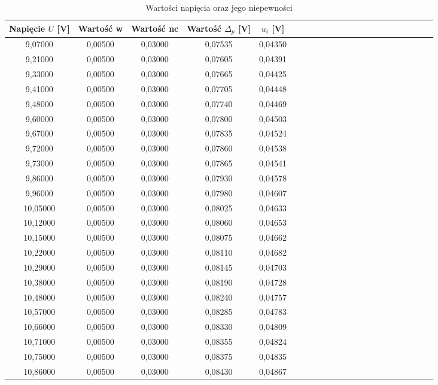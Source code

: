 \documentclass[10pt,a4paper]{article}
\begin{document}
\begin{center}
 \begin{table}[h!]
 \centering
 \caption{Wartości napięcia oraz jego niepewności}
 \begin{tabular}{|c|c|c|c|c|c|c|c|c|c|c|c|c|c|c|c|c|c|c|c|c|c|}
 \hline
Napięcie $U$ [V]&Wartość w& Wartość nc&Wartość $\Delta_{p}$ [V]& $u_{i}$ [V]\\ 
\hline
9,07000  & 0,00500 & 0,03000 & 0,07535 & 0,04350 \\ \hline
9,21000  & 0,00500 & 0,03000 & 0,07605 & 0,04391 \\ \hline
9,33000  & 0,00500 & 0,03000 & 0,07665 & 0,04425 \\ \hline
9,41000  & 0,00500 & 0,03000 & 0,07705 & 0,04448 \\ \hline
9,48000  & 0,00500 & 0,03000 & 0,07740 & 0,04469 \\ \hline
9,60000  & 0,00500 & 0,03000 & 0,07800 & 0,04503 \\ \hline
9,67000  & 0,00500 & 0,03000 & 0,07835 & 0,04524 \\ \hline
9,72000  & 0,00500 & 0,03000 & 0,07860 & 0,04538 \\ \hline
9,73000  & 0,00500 & 0,03000 & 0,07865 & 0,04541 \\ \hline
9,86000  & 0,00500 & 0,03000 & 0,07930 & 0,04578 \\ \hline
9,96000  & 0,00500 & 0,03000 & 0,07980 & 0,04607 \\ \hline
10,05000 & 0,00500 & 0,03000 & 0,08025 & 0,04633 \\ \hline
10,12000 & 0,00500 & 0,03000 & 0,08060 & 0,04653 \\ \hline
10,15000 & 0,00500 & 0,03000 & 0,08075 & 0,04662 \\ \hline
10,22000 & 0,00500 & 0,03000 & 0,08110 & 0,04682 \\ \hline
10,29000 & 0,00500 & 0,03000 & 0,08145 & 0,04703 \\ \hline
10,38000 & 0,00500 & 0,03000 & 0,08190 & 0,04728 \\ \hline
10,48000 & 0,00500 & 0,03000 & 0,08240 & 0,04757 \\ \hline
10,57000 & 0,00500 & 0,03000 & 0,08285 & 0,04783 \\ \hline
10,66000 & 0,00500 & 0,03000 & 0,08330 & 0,04809 \\ \hline
10,71000 & 0,00500 & 0,03000 & 0,08355 & 0,04824 \\ \hline
10,75000 & 0,00500 & 0,03000 & 0,08375 & 0,04835 \\ \hline
10,86000 & 0,00500 & 0,03000 & 0,08430 & 0,04867 \\ \hline

\end{tabular}
\end{table}
\end{center}
\end{document}
